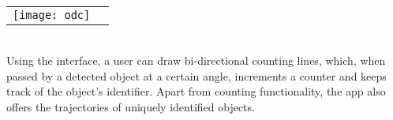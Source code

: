 \ \\
\raggedbottom
\noindent
\begin{tabular}{@{}cc}
\texttt{[image: odc]} 
\end{tabular}
\label{web_interface}
\ \\

Using the interface, a user can draw bi-directional counting lines, which, when passed by a detected object at a certain angle, 
increments a counter and keeps track of the object's identifier. Apart from counting functionality, the app also offers the trajectories of uniquely identified objects. 

\raggedbottom